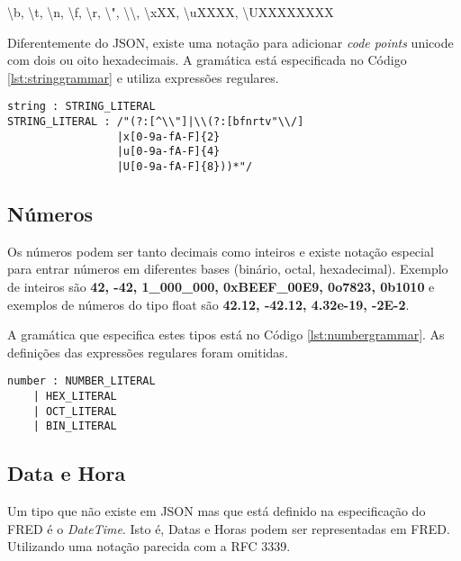 \begin{center}    
    \textbackslash b, \textbackslash t, \textbackslash n, \textbackslash f, 
    \textbackslash r, \textbackslash ", \textbackslash \textbackslash , \textbackslash xXX, 
    \textbackslash uXXXX, \textbackslash UXXXXXXXX
\end{center}

Diferentemente do JSON, existe uma notação para adicionar \textit{code points} unicode com 
dois ou oito hexadecimais. A gramática está especificada no Código \ref{lst:stringgrammar} e 
utiliza expressões regulares.

\begin{lstlisting}[caption=Gramática para strings,label={lst:stringgrammar}]
string : STRING_LITERAL
STRING_LITERAL : /"(?:[^\\"]|\\(?:[bfnrtv"\\/]
                 |x[0-9a-fA-F]{2}
                 |u[0-9a-fA-F]{4}
                 |U[0-9a-fA-F]{8}))*"/
\end{lstlisting}    

\subsection{Números}

Os números podem ser tanto decimais como inteiros e existe notação especial para
entrar números em diferentes bases (binário, octal, hexadecimal). Exemplo de inteiros 
são \textbf{42, -42, 1\_000\_000, 0xBEEF\_00E9, 0o7823, 0b1010} e exemplos de números do tipo
float são \textbf{42.12, -42.12, 4.32e-19, -2E-2}.

A gramática que especifica estes tipos está no Código \ref{lst:numbergrammar}. As definições das
expressões regulares foram omitidas.

\begin{lstlisting}[caption=Gramática para números,label={lst:numbergrammar}]
number : NUMBER_LITERAL 
    | HEX_LITERAL
    | OCT_LITERAL
    | BIN_LITERAL 
\end{lstlisting}    

\subsection{Data e Hora}

Um tipo que não existe em JSON mas que está definido na especificação do FRED é o \textit{DateTime}.
Isto é, Datas e Horas podem ser representadas em FRED. Utilizando uma notação parecida com
a RFC 3339.

